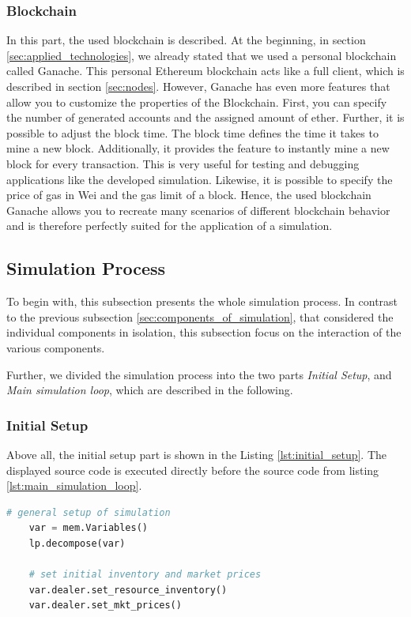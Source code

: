 \subsubsection{Blockchain}
In this part, the used blockchain is described. At the beginning, in section \ref{sec:applied_technologies}, we already
stated that we used a personal blockchain called Ganache. 
This personal Ethereum blockchain acts like a full client, which is described in section \ref{sec:nodes}.
However, Ganache has even more features that allow you to customize the properties of the Blockchain.
First, you can specify the number of generated accounts and the assigned amount of ether.
Further, it is possible to adjust the block time. The block time defines the time it takes to mine a new block. 
Additionally, it provides the feature to instantly mine a new block for every transaction. 
This is very useful for testing and debugging applications like the developed simulation.
Likewise, it is possible to specify the price of gas in Wei and the gas limit of a block. 
Hence, the used blockchain Ganache allows you to recreate many scenarios of different blockchain behavior
and is therefore perfectly suited for the application of a simulation.


\subsection{Simulation Process}
To begin with, this subsection presents the whole simulation process. 
In contrast to the previous subsection \ref{sec:components_of_simulation}, that 
considered the individual components in isolation, this subsection focus 
on the interaction of the various components.

Further, we divided the simulation process into 
the two parts \textit{Initial Setup}, and \textit{Main simulation loop},
which are described in the following.

\subsubsection{Initial Setup}
Above all, the initial setup part is shown in the Listing \ref{lst:initial_setup}.
The displayed source code is executed directly before the source code from listing \ref{lst:main_simulation_loop}.

\begin{lstlisting}[float=htbp, label=lst:initial_setup, caption=Initial setup of the simulation, language=Python]
    # general setup of simulation
    var = mem.Variables()
    lp.decompose(var)

    # set initial inventory and market prices
    var.dealer.set_resource_inventory()
    var.dealer.set_mkt_prices()  
\end{lstlisting}

